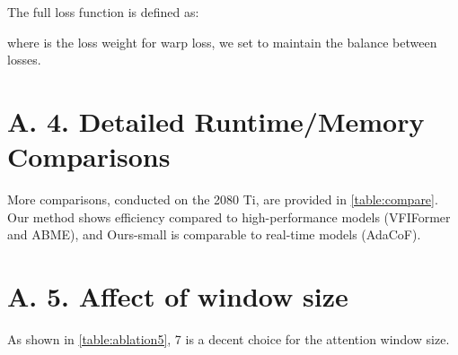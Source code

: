 \documentclass[10pt,twocolumn,letterpaper]{article}
\begin{document}
The full loss function is defined as:

where  is the loss weight for warp loss, we set  to maintain the balance between losses.

\section*{A. 4. Detailed Runtime/Memory Comparisons}
More comparisons, conducted on the 2080 Ti, are provided in \cref{table:compare}. Our method shows efficiency compared to high-performance models (VFIFormer and ABME), and Ours-small is comparable to real-time models (AdaCoF).
\begin{table}[h]
\setlength{\belowcaptionskip}{0pt}
\renewcommand\arraystretch{1.1}
\centering
\vspace{-0.12in}
\caption{More Runtime/Memory Comparisons.}
\vspace{-0.12in}
\label{table:compare}
\label{t2}
\vspace{-0.25in}
\end{table}

\section*{A. 5. Affect of window size}
As shown in \cref{table:ablation5}, 7 is a decent choice for the attention window size.

\begin{table}[h]
        \setlength{\belowcaptionskip}{0pt}
        \renewcommand\arraystretch{1.1}
        \centering
        \vspace{-0.12in}
        \caption{Affect of window size.}
        \vspace{-0.12in}
        \label{table:ablation5}
        \label{t1}
        \vspace{-0.15in}
        \end{table}
\end{document}
